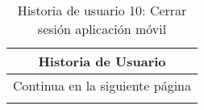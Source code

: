 

\begin{longtable}{|p{6.7cm}|p{6.7cm}|}
    \caption{Historia de usuario 10: Cerrar sesión aplicación móvil} \label{tab:historia-10}
    \\
    \hline
    \multicolumn{2}{|c|}{\textbf{Historia de Usuario}}                                                                                                  \\
    \hline

    \endfirsthead

    \hline
    \endhead

    \hline
    \multicolumn{2}{|c|}{{Continua en la siguiente página}}                                                                                             \\
    \hline
    \endfoot

    \hline
    \endlastfoot


\end{longtable}
